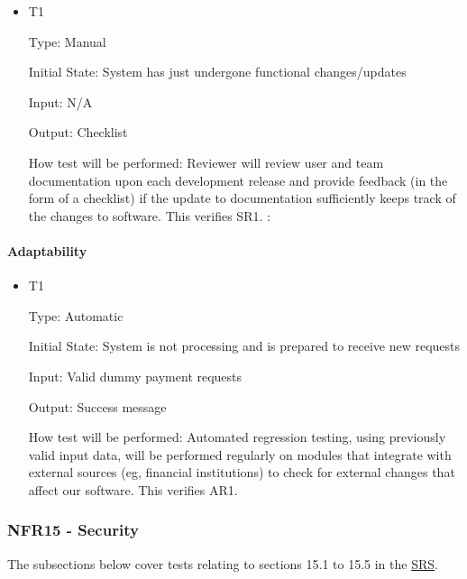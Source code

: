 \documentclass[12pt, titlepage]{article}
\begin{document}
\begin{itemize}

\item{T1\\}
\hypertarget{NFR14.2-TC1}{}

Type: Manual

Initial State: System has just undergone functional changes/updates

Input: N/A

Output: Checklist

How test will be performed: Reviewer will review user and team documentation upon each development release and provide feedback (in the form of a checklist) if the update to documentation sufficiently keeps track of the changes to software. This verifies SR1.
:
\end{itemize}

\paragraph{Adaptability}

\begin{itemize}

\item{T1\\}
\hypertarget{NFR14.3-TC1}{}

Type: Automatic

Initial State: System is not processing and is prepared to receive new requests

Input: Valid dummy payment requests

Output: Success message

How test will be performed: Automated regression testing, using previously valid input data, will be performed regularly on modules that integrate with external sources (eg, financial institutions) to check for external changes that affect our software. This verifies AR1.

\end{itemize}

\hypertarget{nfr15}{}
\subsubsection{NFR15 - Security}

The subsections below cover tests relating to sections 15.1 to 15.5 in the \href{https://shorturl.at/FdAgR}{SRS}.
\end{document}
